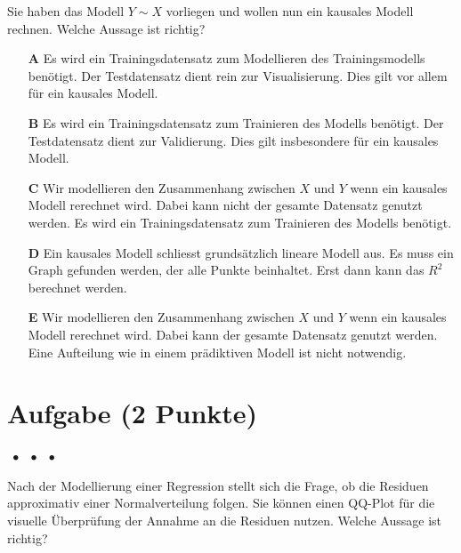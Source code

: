 \documentclass[a4paper, 9pt]{scrartcl}\usepackage[]{graphicx}\usepackage[]{xcolor}
\begin{document}
Sie haben das Modell $Y \sim X$ vorliegen und wollen nun ein kausales Modell rechnen. Welche Aussage ist richtig?



\begin{enumerate}
\item [\textbf{A} \msquare] Es wird ein Trainingsdatensatz zum Modellieren des Trainingsmodells benötigt. Der Testdatensatz dient rein zur Visualisierung. Dies gilt vor allem für ein kausales Modell.
\item [\textbf{B} \msquare] Es wird ein Trainingsdatensatz zum Trainieren des Modells benötigt. Der Testdatensatz dient zur Validierung. Dies gilt insbesondere für ein kausales Modell.
\item [\textbf{C} \msquare] Wir modellieren den Zusammenhang zwischen $X$ und $Y$ wenn ein kausales Modell rerechnet wird. Dabei kann nicht der gesamte Datensatz genutzt werden. Es wird ein Trainingsdatensatz zum Trainieren des Modells benötigt.
\item [\textbf{D} \msquare] Ein kausales Modell schliesst grundsätzlich lineare Modell aus. Es muss ein Graph gefunden werden, der alle Punkte beinhaltet. Erst dann kann das $R^2$ berechnet werden.
\item [\textbf{E} \msquare] Wir modellieren den Zusammenhang zwischen $X$ und $Y$ wenn ein kausales Modell rerechnet wird. Dabei kann der gesamte Datensatz genutzt werden. Eine Aufteilung wie in einem prädiktiven Modell ist nicht notwendig.
\end{enumerate}

\section{Aufgabe \hfill (2 Punkte)}

\ifcollection
\begin{flushright}
\tiny\vspace{-2Ex}
\textbf{\examinhaltstart}
\exammodulestat $\;\bullet$
\exammodulestatbbv $\;\bullet$
\exammodulestatversuch $\;\bullet$
\exammodulebiostat
\vspace{-1Ex}
\end{flushright}
\fi




Nach der Modellierung einer Regression stellt sich die Frage, ob die Residuen approximativ einer Normalverteilung folgen. Sie können einen QQ-Plot für die visuelle Überprüfung der Annahme an die Residuen nutzen. Welche Aussage ist richtig?
\end{document}
